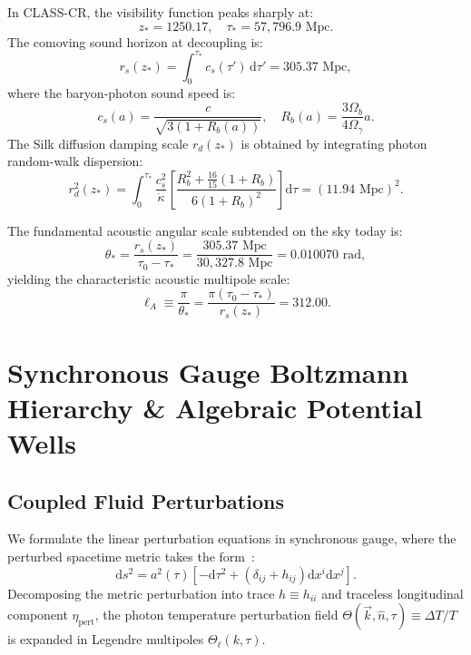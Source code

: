 \documentclass[aps,prd,reprint,superscriptaddress,nofootinbib,twocolumn]{revtex4-2}
\begin{document}
In CLASS-CR, the visibility function peaks sharply at:
\begin{equation}
\label{eq:decoupling_peak}
z_* = 1250.17, \quad \tau_* = 57{,}796.9\text{ Mpc}.
\end{equation}
The comoving sound horizon at decoupling is:
\begin{equation}
\label{eq:sound_horizon}
r_s(z_*) = \int_0^{\tau_*} c_s(\tau')\,\mathrm{d}\tau' = 305.37\text{ Mpc},
\end{equation}
where the baryon-photon sound speed is:
\begin{equation}
\label{eq:sound_speed}
c_s(a) = \frac{c}{\sqrt{3(1 + R_b(a))}}, \quad R_b(a) = \frac{3 \Omega_b}{4 \Omega_\gamma} a.
\end{equation}
The Silk diffusion damping scale $r_d(z_*)$ is obtained by integrating photon random-walk dispersion:
\begin{equation}
\label{eq:silk_damping_integral}
r_d^2(z_*) = \int_0^{\tau_*} \frac{c_s^2}{\dot{\kappa}} \left[\frac{R_b^2 + \frac{16}{15}(1 + R_b)}{6(1 + R_b)^2}\right] \mathrm{d}\tau = (11.94\text{ Mpc})^2.
\end{equation}

The fundamental acoustic angular scale subtended on the sky today is:
\begin{equation}
\label{eq:acoustic_scale}
\theta_* = \frac{r_s(z_*)}{\tau_0 - \tau_*} = \frac{305.37\text{ Mpc}}{30{,}327.8\text{ Mpc}} = 0.010070\text{ rad},
\end{equation}
yielding the characteristic acoustic multipole scale:
\begin{equation}
\label{eq:ell_A}
\ell_A \equiv \frac{\pi}{\theta_*} = \frac{\pi (\tau_0 - \tau_*)}{r_s(z_*)} = 312.00.
\end{equation}

\section{Synchronous Gauge Boltzmann Hierarchy \& Algebraic Potential Wells}
\label{sec:perturbations}

\subsection{Coupled Fluid Perturbations}

We formulate the linear perturbation equations in synchronous gauge, where the perturbed spacetime metric takes the form~\cite{MaBertschinger1995}:
\begin{equation}
\label{eq:metric_pert}
\mathrm{d}s^2 = a^2(\tau) \left[ -\mathrm{d}\tau^2 + (\delta_{ij} + h_{ij})\mathrm{d}x^i\mathrm{d}x^j \right].
\end{equation}
Decomposing the metric perturbation into trace $h \equiv h_{ii}$ and traceless longitudinal component $\eta_{\text{pert}}$, the photon temperature perturbation field $\Theta(\vec{k}, \hat{n}, \tau) \equiv \Delta T / T$ is expanded in Legendre multipoles $\Theta_\ell(k, \tau)$. 
\end{document}
